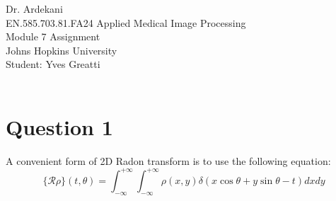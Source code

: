 \documentclass[12pt,twoside]{article}
\begin{document}
\noindent Dr. Ardekani\\
EN.585.703.81.FA24 Applied Medical Image Processing\\
Module 7 Assignment\\
Johns Hopkins University\\
Student: Yves Greatti\\\


\section*{Question 1}
 A convenient form of 2D Radon transform is to use the following equation:
 \begin{equation}
    \{ \mathcal{R} \rho \}(t, \theta) = \int_{-\infty}^{+\infty} \int_{-\infty}^{+\infty} \rho(x, y) \delta(x \cos \theta + y \sin \theta - t) dx dy
  \end{equation}
  
\end{document}
